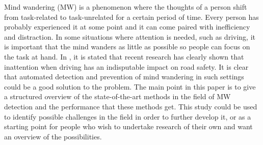 Mind wandering (MW) is a phenomenon where the thoughts of a person shift from task-related to task-unrelated for a certain period of time. Every person has probably experienced it at some point and it can come paired with inefficiency and distraction. In some situations where attention is needed, such as driving, it is important that the mind wanders as little as possible so people can focus on the task at hand. In \cite{berthie2015restless}, it is stated that recent research has clearly shown that inattention when driving has an indisputable impact on road safety. It is clear that automated detection and prevention of mind wandering in such settings could be a good solution to the problem. The main point in this paper is to give a structured overview of the state-of-the-art methods in the field of MW detection and the performance that these methods get. This study could be used to identify possible challenges in the field in order to further develop it, or as a starting point for people who wish to undertake research of their own and want an overview of the possibilities.